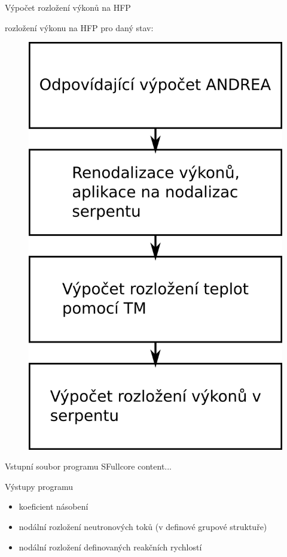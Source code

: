 \documentclass{beamer}
\begin{document}
\begin{frame}{Výpočet rozložení výkonů na HFP}

rozložení výkonu na HFP pro daný stav:
	
\begin{figure}
	\centering
	\includegraphics[scale=0.5]{img/vypocet_teploty.png}
\end{figure}
\end{frame}

\begin{frame}{Vstupní soubor programu SFullcore}
	content...
\end{frame}

\begin{frame}{Výstupy programu}
\begin{itemize}\footnotesize
	\item koeficient násobení
	\item nodální rozložení neutronových toků (v definové grupové struktuře)
	\item nodální rozložení definovaných reakčních rychlostí
\end{itemize}	
	
\end{frame}
\end{document}
